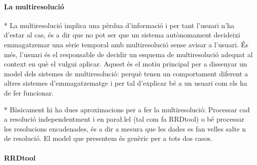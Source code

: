 \paragraph{La multiresolució}








* La multiresolució implica una pèrdua d'informació i per tant l'usuari n'ha d'estar al cas, és a dir que no pot ser que un sistema autònomament decideixi emmagatzemar una sèrie temporal amb multiresolució sense avisar a l'usuari. És més, l'usuari és el responsable de decidir un esquema de multiresolució adequat al context en què el vulgui aplicar.  Aquest és el motiu principal per a dissenyar un model dels sistemes de multiresolució: perquè tenen un comportament diferent a altres sistemes d'emmagatzematge i per tal d'explicar bé a un usuari com els ha de fer funcionar.


* Bàsicament hi ha dues aproximacions per a fer la multiresolució: Processar cad
a resolució independentment i en para\l.lel (tal com fa RRDtool) o bé processar 
les resolucions encadenades, és a dir a mesura que les dades es fan velles salte
n de resolució. El model que presentem és genèric per a tots dos casos.








\paragraph{RRDtool}



